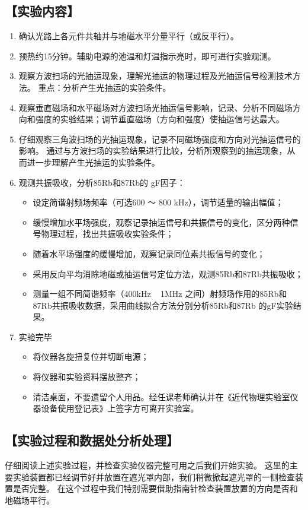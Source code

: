 \documentclass[12pt,a4paper,UTF8]{ctexart}
\begin{document}
\subsection*{【实验内容】}
\begin{enumerate}
	\item 确认光路上各元件共轴并与地磁水平分量平行（或反平行）。
	\item 预热约15分钟。辅助电源的池温和灯温指示亮时，即可进行实验观测。
	\item 观察方波扫场的光抽运现象，理解光抽运的物理过程及光抽运信号检测技术方法。
	重点：分析产生光抽运的实验条件。

	\item 观察垂直磁场和水平磁场对方波扫场光抽运信号影响，记录、分析不同磁场方向和强度的实验结果；调节垂直磁场（方向和强度）使抽运信号达最大。
	\item 仔细观察三角波扫场的光抽运现象，记录不同磁场强度和方向对光抽运信号的影响。
	通过与方波扫场的实验结果进行比较，分析所观察到的抽运现象，从而进一步理解产生光抽运的实验条件。

	\item 观测共振吸收，分析85Rb和87Rb的 gF因子：
	\begin{itemize}
		\item 设定简谐射频场频率（可选600 ～ 800 kHz），调节适量的输出幅值； 

		\item 缓慢增加水平场强度，观察记录抽运信号和共振信号的变化，区分两种信号物理过程，找出共振吸收实验条件；
		\item 随着水平场强度的缓慢增加，观察记录同位素共振信号的变化； 
		\item 采用反向平均消除地磁或抽运信号定位方法，观测85Rb和87Rb共振吸收； 
		\item 测量一组不同简谐频率（400kHz ~ 1MHz 之间）射频场作用的85Rb和87Rb共振吸收数据，采用曲线拟合方法分别分析85Rb和87Rb 的gF实验结果。
	\end{itemize}

	\item 实验完毕
	\begin{itemize}
		\item 将仪器各旋扭复位并切断电源；
		\item 将仪器和实验资料摆放整齐；
		\item 清洁桌面，不要遗留个人用品。经任课老师确认并在《近代物理实验室仪器设备使用登记表》上签字方可离开实验室。
	\end{itemize}
\end{enumerate}

\subsection*{【实验过程和数据处分析处理】}
仔细阅读上述实验过程，并检查实验仪器完整可用之后我们开始实验。
这里的主要实验装置都已经调节好并放置在遮光罩内部，我们稍微掀起遮光罩的一侧检查装置是否完整。
在这个过程中我们特别需要借助指南针检查装置放置的方向是否和地磁场平行。
\end{document}
